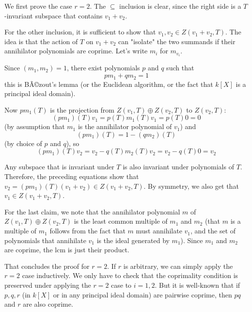 \documentclass[12pt]{article}
\begin{document}
We first prove the case $r=2$. The $\subseteq$ inclusion is clear, since the right side is a $T$-invariant subspace that contains $v_1+v_2$. 

For the other inclusion, it is sufficient to show that $v_1,v_2 \in Z(v_1+v_2,T)$. The idea is that the action of $T$ on $v_1 + v_2$ can "isolate" the two summands if their annihilator polynomials are coprime. Let's write $m_i$ for $m_{v_i}$.

Since $(m_1,m_2)=1$, there exist polynomials $p$ and $q$ such that 
\begin{equation}pm_1+qm_2=1\end{equation}
this is BÃ©zout's lemma (or the Euclidean algorithm, or the fact that $k[X]$ is a principal ideal domain).


Now $pm_1(T)$ is the projection from $Z(v_1,T) \oplus Z(v_2,T)$ to $Z(v_2,T)$:
\begin{equation}(pm_1)(T)v_1=p(T)m_1(T) v_1 = p(T)0 = 0\end{equation}
(by assumption that $m_1$ is the annihilator polynomial of $v_1$) and 
\begin{equation}(pm_1)(T) = 1-(qm_2)(T)\end{equation} 
(by choice of $p$ and $q$), so
\begin{equation}(pm_1)(T) v_2 = v_2 - q(T)m_2(T) v_2 = v_2 - q(T)0 = v_2\end{equation} 

Any subspace that is invariant under $T$ is also invariant under polynomials of $T$. Therefore, the preceding equations show that $v_2 = (pm_1)(T)(v_1+v_2) \in Z(v_1+v_2,T)$. By symmetry, we also get that $v_1 \in Z(v_1+v_2,T)$.

For the last claim, we note that the annihilator polynomial $m$ of $Z(v_1,T) \oplus Z(v_2,T)$ is the least common multiple of $m_1$ and $m_2$ (that $m$ is a multiple of $m_1$ follows from the fact that $m$ must annihilate $v_1$, and the set of polynomials that annihilate $v_1$ is the ideal generated by $m_1$). Since $m_1$ and $m_2$ are coprime, the lcm is just their product.

That concludes the proof for $r=2$. If $r$ is arbitrary, we can simply apply the $r=2$ case inductively. We only have to check that the coprimality condition is preserved under applying the $r=2$ case to $i=1,2$. But it is well-known that if $p,q,r$ (in $k[X]$ or in any principal ideal domain) are pairwise coprime, then $pq$ and $r$ are also coprime.

\end{document}

